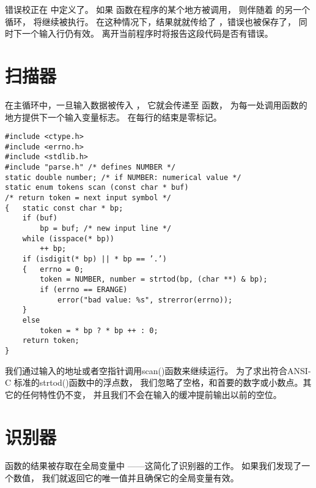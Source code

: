 错误校正在  中定义了。
如果  函数在程序的某个地方被调用，
则伴随着  的另一个循环， 将继续被执行。
在这种情况下，结果就就传给了 ，错误也被保存了，
同时下一个输入行仍有效。
离开当前程序时将报告这段代码是否有错误。


\section{扫描器}
\label{sec:scanner}

在主循环中，一旦输入数据被传入 ，
它就会传递至  函数，
为每一处调用函数的地方提供下一个输入变量标志。
在每行的结束是零标记。

\begin{lstlisting}
#include <ctype.h>
#include <errno.h>
#include <stdlib.h>
#include "parse.h" /* defines NUMBER */
static double number; /* if NUMBER: numerical value */
static enum tokens scan (const char * buf)
/* return token = next input symbol */
{   static const char * bp;
    if (buf)
        bp = buf; /* new input line */
    while (isspace(* bp))
        ++ bp;
    if (isdigit(* bp) || * bp == ’.’)
    {   errno = 0;
        token = NUMBER, number = strtod(bp, (char **) & bp);
        if (errno == ERANGE)
            error("bad value: %s", strerror(errno));
    }
    else
        token = * bp ? * bp ++ : 0;
    return token;
}
\end{lstlisting}

我们通过输入的地址或者空指针调用scan()函数来继续运行。
为了求出符合ANSI-C 标准的strtod()函数中的浮点数，
我们忽略了空格，和首要的数字或小数点。其它的任何特性仍不变，%
并且我们不会在输入的缓冲提前输出以前的空位。


\section{识别器}
\label{sec:recogn}

 函数的结果被存取在全局变量中
——这简化了识别器的工作。
如果我们发现了一个数值，
我们就返回它的唯一值并且确保它的全局变量有效。

